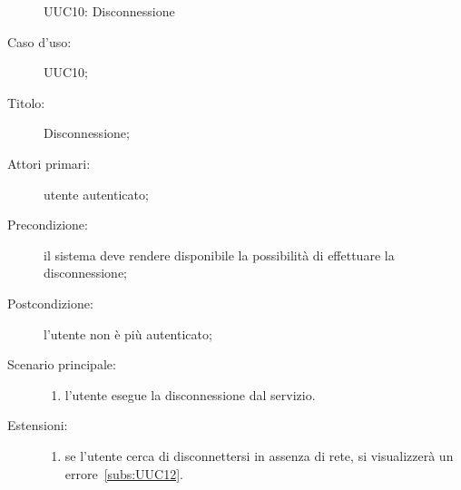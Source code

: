 \documentclass[../../../analisi-dei-requisiti.tex]{subfiles}
\begin{document}
\begin{figure}[H]
  \centering
  \caption{UUC10: Disconnessione}%
  \label{fig:UUC10}
\end{figure}

  \begin{description}
  \item[Caso d’uso:] UUC10;
  \item[Titolo:] Disconnessione;
  \item[Attori primari:] utente autenticato;
  \item[Precondizione:] il sistema deve rendere disponibile la possibilità di effettuare la disconnessione;
  \item[Postcondizione:] l'utente non è più autenticato;
  \item[Scenario principale:]
        \begin{enumerate}
          \item l'utente esegue la disconnessione dal servizio.
        \end{enumerate}
  \item[Estensioni:]
        \begin{enumerate}
          \item se l'utente cerca di disconnettersi in assenza di rete, si visualizzerà un errore~\ref{subs:UUC12}.
        \end{enumerate}
\end{description}
\end{document}
